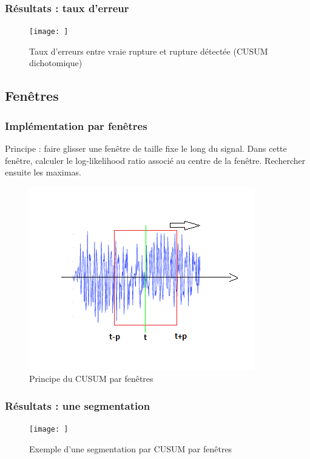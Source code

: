 \documentclass{beamer}
\begin{document}
\begin{frame}
	\frametitle{Résultats : taux d'erreur}
	\begin{figure}
		\texttt{[image: ]}
		\caption{Taux d'erreurs entre vraie rupture et rupture détectée (CUSUM dichotomique)}
	\end{figure}
\end{frame}

\subsection{Fenêtres}

\begin{frame}

\frametitle{Implémentation par fenêtres}
Principe : faire glisser une fenêtre de taille fixe le long du signal. Dans cette fenêtre, calculer le log-likelihood ratio associé au centre de la fenêtre. Rechercher ensuite les maximas.

\begin{figure}
	\includegraphics[scale=0.6]{diagramme_cusum_fen.png}
	\caption{Principe du CUSUM par fenêtres}
\end{figure}



\end{frame}

\begin{frame}
	\frametitle{Résultats : une segmentation}
	\begin{figure}
		\texttt{[image: ]}
		\caption{Exemple d'une segmentation par CUSUM par fenêtres}
	\end{figure}
\end{frame}
\end{document}
